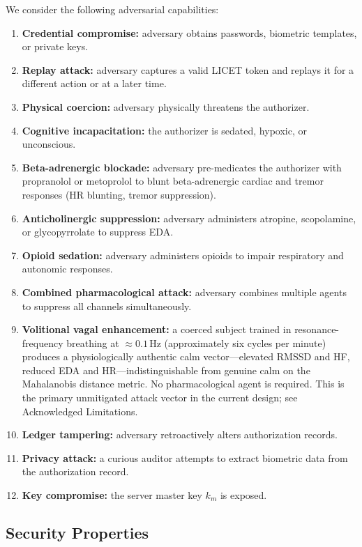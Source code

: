 \documentclass[12pt,a4paper]{article}
\begin{document}
We consider the following adversarial capabilities:
\begin{enumerate}
  \item \textbf{Credential compromise:} adversary obtains passwords, biometric
  templates, or private keys.
  \item \textbf{Replay attack:} adversary captures a valid LICET token and
  replays it for a different action or at a later time.
  \item \textbf{Physical coercion:} adversary physically threatens the
  authorizer.
  \item \textbf{Cognitive incapacitation:} the authorizer is sedated, hypoxic,
  or unconscious.
  \item \textbf{Beta-adrenergic blockade:} adversary pre-medicates the
  authorizer with propranolol or metoprolol to blunt beta-adrenergic cardiac
  and tremor responses (HR blunting, tremor suppression).
  \item \textbf{Anticholinergic suppression:} adversary administers atropine,
  scopolamine, or glycopyrrolate to suppress EDA.
  \item \textbf{Opioid sedation:} adversary administers opioids to impair
  respiratory and autonomic responses.
  \item \textbf{Combined pharmacological attack:} adversary combines multiple
  agents to suppress all channels simultaneously.
  \item \textbf{Volitional vagal enhancement:} a coerced subject trained in
  resonance-frequency breathing at $\approx 0.1$\,Hz (approximately six cycles
  per minute) produces a physiologically authentic calm vector---elevated RMSSD
  and HF, reduced EDA and HR---indistinguishable from genuine calm on the
  Mahalanobis distance metric. No pharmacological agent is required. This is
  the primary unmitigated attack vector in the current design; see
  Acknowledged Limitations.
  \item \textbf{Ledger tampering:} adversary retroactively alters authorization
  records.
  \item \textbf{Privacy attack:} a curious auditor attempts to extract
  biometric data from the authorization record.
  \item \textbf{Key compromise:} the server master key $k_m$ is exposed.
\end{enumerate}

\subsection{Security Properties}
\end{document}

